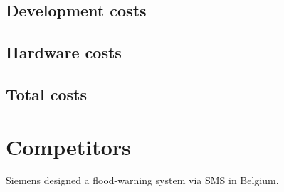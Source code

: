 \subsection{Development costs}

\subsection{Hardware costs}

\subsection{Total costs}


\section{Competitors}
Siemens designed a flood-warning system via SMS in Belgium.

